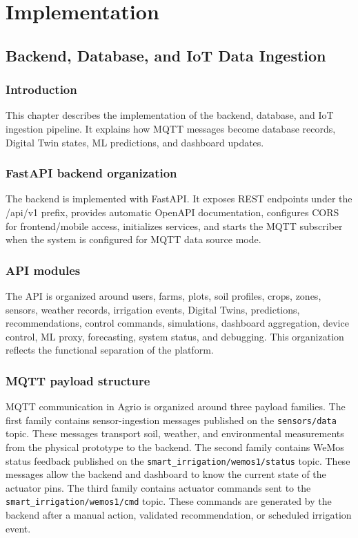 ﻿\part{Implementation}

\chapter{Backend, Database, and IoT Data Ingestion}
\label{chap:backend_database_iot}

\section{Introduction}

This chapter describes the implementation of the backend, database, and IoT ingestion pipeline. It explains how MQTT messages become database records, Digital Twin states, ML predictions, and dashboard updates.

\section{FastAPI backend organization}

The backend is implemented with FastAPI. It exposes REST endpoints under the /api/v1 prefix, provides automatic OpenAPI documentation, configures CORS for frontend/mobile access, initializes services, and starts the MQTT subscriber when the system is configured for MQTT data source mode.

\section{API modules}

The API is organized around users, farms, plots, soil profiles, crops, zones, sensors, weather records, irrigation events, Digital Twins, predictions, recommendations, control commands, simulations, dashboard aggregation, device control, ML proxy, forecasting, system status, and debugging. This organization reflects the functional separation of the platform.

\section{MQTT payload structure}

MQTT communication in Agrio is organized around three payload families. The first family contains sensor-ingestion messages published on the \texttt{sensors/data} topic. These messages transport soil, weather, and environmental measurements from the physical prototype to the backend. The second family contains WeMos status feedback published on the \texttt{smart\_irrigation/wemos1/status} topic. These messages allow the backend and dashboard to know the current state of the actuator pins. The third family contains actuator commands sent to the \texttt{smart\_irrigation/wemos1/cmd} topic. These commands are generated by the backend after a manual action, validated recommendation, or scheduled irrigation event.


